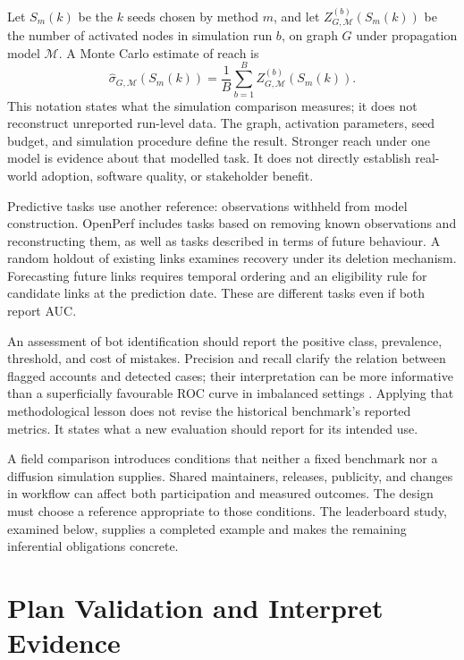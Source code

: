 Let \(S_m(k)\) be the \(k\) seeds chosen by method \(m\), and let \(Z_{G,\mathcal M}^{(b)}(S_m(k))\) be the number of activated nodes in simulation run \(b\), on graph \(G\) under propagation model \(\mathcal M\). A Monte Carlo estimate of reach is
\begin{equation}
\widehat\sigma_{G,\mathcal M}\!\left(S_m(k)\right)
 =\frac{1}{B}\sum_{b=1}^{B}Z_{G,\mathcal M}^{(b)}\!\left(S_m(k)\right).
\label{eq:ch3-reach}
\end{equation}
This notation states what the simulation comparison measures; it does not reconstruct unreported run-level data. The graph, activation parameters, seed budget, and simulation procedure define the result. Stronger reach under one model is evidence about that modelled task. It does not directly establish real-world adoption, software quality, or stakeholder benefit.

Predictive tasks use another reference: observations withheld from model construction. OpenPerf includes tasks based on removing known observations and reconstructing them, as well as tasks described in terms of future behaviour. A random holdout of existing links examines recovery under its deletion mechanism. Forecasting future links requires temporal ordering and an eligibility rule for candidate links at the prediction date. These are different tasks even if both report AUC.

An assessment of bot identification should report the positive class, prevalence, threshold, and cost of mistakes. Precision and recall clarify the relation between flagged accounts and detected cases; their interpretation can be more informative than a superficially favourable ROC curve in imbalanced settings \citep{saito2015}. Applying that methodological lesson does not revise the historical benchmark's reported metrics. It states what a new evaluation should report for its intended use.

A field comparison introduces conditions that neither a fixed benchmark nor a diffusion simulation supplies. Shared maintainers, releases, publicity, and changes in workflow can affect both participation and measured outcomes. The design must choose a reference appropriate to those conditions. The leaderboard study, examined below, supplies a completed example and makes the remaining inferential obligations concrete.

\section{Plan Validation and Interpret Evidence}
\label{sec:ch3-validity}
\label{sec:ch3-decision}

